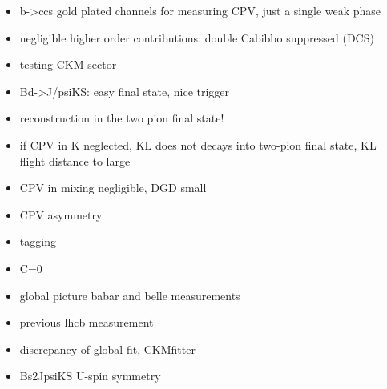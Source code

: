 \begin{itemize}
  \item b->ccs gold plated channels for measuring CPV, just a single weak phase
  \item negligible higher order contributions: double Cabibbo suppressed (DCS)
  \item testing CKM sector
  \item Bd->J/psiKS: easy final state, nice trigger
  \item reconstruction in the two pion final state!
  \item if CPV in K neglected, KL does not decays into two-pion final state, KL flight distance to large
  \item CPV in mixing negligible, DGD small
  \item CPV asymmetry
  \item tagging
  \item C=0 
  \item global picture babar and belle measurements
  \item previous lhcb measurement
  \item discrepancy of global fit, CKMfitter
  \item Bs2JpsiKS U-spin symmetry
\end{itemize}